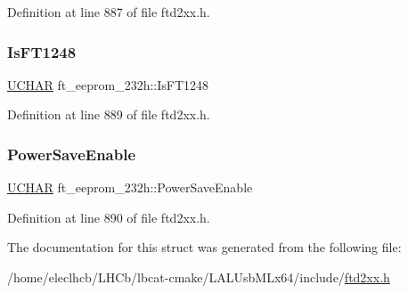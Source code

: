 Definition at line 887 of file ftd2xx.\+h.

\mbox{\label{structft__eeprom__232h_aa2b426719debc007b4ce6166524ca68f}} 
\subsubsection{\texorpdfstring{Is\+F\+T1248}{IsFT1248}}
{\footnotesize\ttfamily \hyperlink{CatCaloProto40MHz_2inc_2WinTypes_8h_a4f4bb67531a9bf6f0b9c6ad76aeba587}{U\+C\+H\+AR} ft\+\_\+eeprom\+\_\+232h\+::\+Is\+F\+T1248}



Definition at line 889 of file ftd2xx.\+h.

\mbox{\label{structft__eeprom__232h_a60637cdb433234aa02093455605abca9}} 
\subsubsection{\texorpdfstring{Power\+Save\+Enable}{PowerSaveEnable}}
{\footnotesize\ttfamily \hyperlink{CatCaloProto40MHz_2inc_2WinTypes_8h_a4f4bb67531a9bf6f0b9c6ad76aeba587}{U\+C\+H\+AR} ft\+\_\+eeprom\+\_\+232h\+::\+Power\+Save\+Enable}



Definition at line 890 of file ftd2xx.\+h.



The documentation for this struct was generated from the following file\+:\begin{DoxyCompactItemize}
\item 
/home/eleclhcb/\+L\+H\+Cb/lbcat-\/cmake/\+L\+A\+L\+Usb\+M\+Lx64/include/\hyperlink{LALUsbMLx64_2include_2ftd2xx_8h}{ftd2xx.\+h}\end{DoxyCompactItemize}
